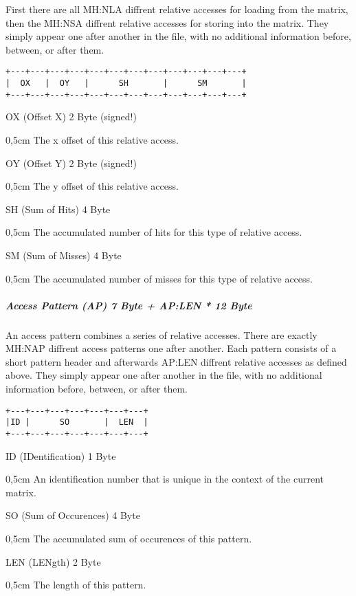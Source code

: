 First there are all MH:NLA diffrent relative accesses for loading from the matrix, then the MH:NSA diffrent 
relative accesses for storing into the matrix. They simply appear one after another in the file, with no 
additional information before, between, or after them.
\begin{verbatim}
+---+---+---+---+---+---+---+---+---+---+---+---+
|  OX   |  OY   |      SH       |      SM       |
+---+---+---+---+---+---+---+---+---+---+---+---+
\end{verbatim}
OX (Offset X) 2 Byte (signed!)
\begin{addmargin}[0,5cm]{0,5cm} 
	The x offset of this relative access.
\end{addmargin}
OY (Offset Y) 2 Byte (signed!)
\begin{addmargin}[0,5cm]{0,5cm} 
	The y offset of this relative access.
\end{addmargin}
SH (Sum of Hits) 4 Byte
\begin{addmargin}[0,5cm]{0,5cm} 
	The accumulated number of hits for this type of relative access.
\end{addmargin}
SM (Sum of Misses) 4 Byte
\begin{addmargin}[0,5cm]{0,5cm} 
	The accumulated number of misses for this type of relative access.
\end{addmargin}

\subparagraph{Access Pattern (AP) 7 Byte + AP:LEN * 12 Byte}$\;$ \\

An access pattern combines a series of relative accesses. There are exactly MH:NAP diffrent access patterns
 one after another. Each pattern consists of a short pattern header and afterwards AP:LEN diffrent relative 
accesses as defined above. They simply appear one after another in the file, with no additional information 
before, between, or after them.
\begin{verbatim}
+---+---+---+---+---+---+---+
|ID |      SO       |  LEN  |
+---+---+---+---+---+---+---+
\end{verbatim}
ID (IDentification) 1 Byte
\begin{addmargin}[0,5cm]{0,5cm} 
	An identification number that is unique in the context of the current matrix.
\end{addmargin}
SO (Sum of Occurences) 4 Byte
\begin{addmargin}[0,5cm]{0,5cm} 
	The accumulated sum of occurences of this pattern.
\end{addmargin}
LEN (LENgth) 2 Byte
\begin{addmargin}[0,5cm]{0,5cm} 
	The length of this pattern.
\end{addmargin}
	
